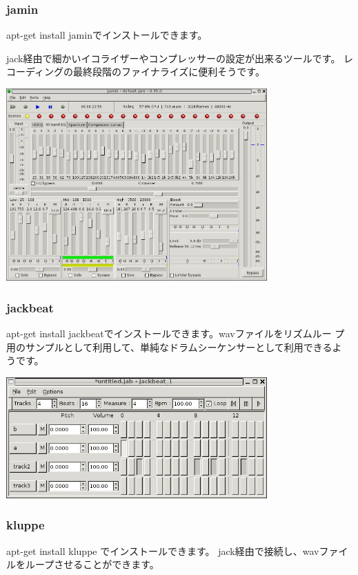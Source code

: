 \documentclass[mingoth,a4paper]{jsarticle}
\begin{document}
\subsubsection{jamin}

apt-get install jaminでインストールできます。

jack経由で細かいイコライザーやコンプレッサーの設定が出来るツールです。
レコーディングの最終段階のファイナライズに便利そうです。

\includegraphics[width=10cm]{image200602/jamin.png}

\subsubsection{jackbeat}

apt-get install jackbeatでインストールできます。wavファイルをリズムルー
プ用のサンプルとして利用して、単純なドラムシーケンサーとして利用できるよ
うです。

\includegraphics[width=10cm]{image200602/jackbeat.png}

\subsubsection{kluppe}

apt-get install kluppe でインストールできます。
jack経由で接続し、wavファイルをループさせることができます。
\end{document}
